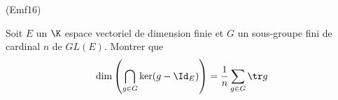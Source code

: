 \begin{tiny}(Emf16)\end{tiny} Soit $E$ un $\K$ espace vectoriel de dimension finie et $G$ un sous-groupe fini de cardinal $n$ de $GL(E)$. Montrer que
\begin{displaymath}
 \dim\left( \bigcap_{g\in G}\ker(g-\Id_E)\right) = \frac{1}{n}\sum_{g\in G}\tr g 
\end{displaymath}

